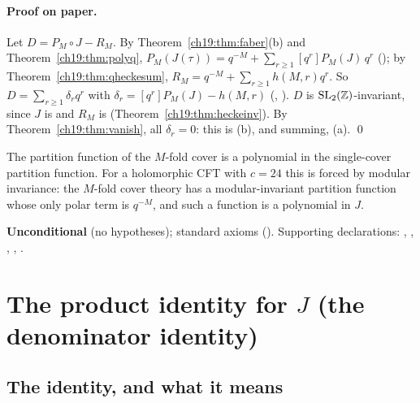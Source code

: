 \paragraph{Proof on paper.}  Let $D=P_M\circ J-R_M$.  By Theorem~\ref{ch19:thm:faber}(b) and Theorem~\ref{ch19:thm:polyq},
$P_M(J(\tau))=q^{-M}+\sum_{r\ge1}[q^r]P_M(J)\,q^r$ (); by Theorem~\ref{ch19:thm:qheckesum},
$R_M=q^{-M}+\sum_{r\ge1}h(M,r)q^r$.  So $D=\sum_{r\ge1}\delta_rq^r$ with $\delta_r=[q^r]P_M(J)-h(M,r)$
(, ).  $D$ is $\mathrm{SL}_2(\mathbb{Z})$-invariant, since $J$ is and $R_M$ is
(Theorem~\ref{ch19:thm:heckeinv}).  By Theorem~\ref{ch19:thm:vanish}, all $\delta_r=0$: this is (b), and summing, (a). \qed
\begin{physics}
The partition function of the $M$-fold cover is a polynomial in the single-cover partition function.  For a holomorphic
CFT with $c=24$ this is forced by modular invariance: the $M$-fold cover theory has a modular-invariant partition function
whose only polar term is $q^{-M}$, and such a function is a polynomial in $J$.
\end{physics}
\begin{status}
\textbf{Unconditional} (no hypotheses); standard axioms ().  Supporting declarations:
, , , ,
.
\end{status}

\section{The product identity for \texorpdfstring{$J$}{J} (the denominator identity)}\label{ch19:sec:denominator}

\subsection{The identity, and what it means}

